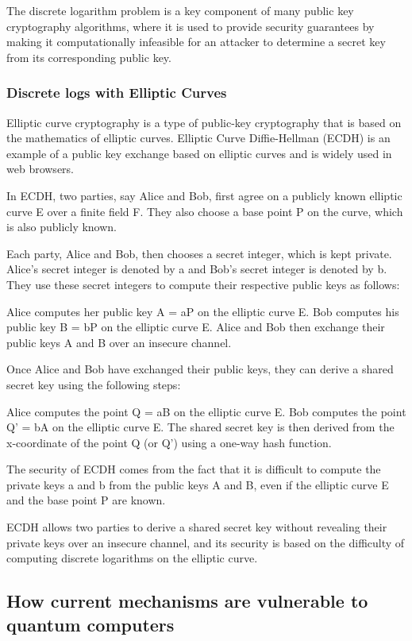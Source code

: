 \documentclass{article}
\begin{document}
The discrete logarithm problem is a key component of many public key cryptography algorithms, where it is used to provide security guarantees by making it computationally infeasible for an attacker to determine a secret key from its corresponding public key.

\subsubsection{Discrete logs with Elliptic Curves}
Elliptic curve cryptography is a type of public-key cryptography that is based on the mathematics of elliptic curves. Elliptic Curve Diffie-Hellman (ECDH) is an example of a public key exchange based on elliptic curves and is widely used in web browsers.

In ECDH, two parties, say Alice and Bob, first agree on a publicly known elliptic curve E over a finite field F. They also choose a base point P on the curve, which is also publicly known.

Each party, Alice and Bob, then chooses a secret integer, which is kept private. Alice's secret integer is denoted by a and Bob's secret integer is denoted by b. They use these secret integers to compute their respective public keys as follows:

Alice computes her public key A = aP on the elliptic curve E.
Bob computes his public key B = bP on the elliptic curve E.
Alice and Bob then exchange their public keys A and B over an insecure channel.

Once Alice and Bob have exchanged their public keys, they can derive a shared secret key using the following steps:

Alice computes the point Q = aB on the elliptic curve E.
Bob computes the point Q' = bA on the elliptic curve E.
The shared secret key is then derived from the x-coordinate of the point Q (or Q') using a one-way hash function.

The security of ECDH comes from the fact that it is difficult to compute the private keys a and b from the public keys A and B, even if the elliptic curve E and the base point P are known.

ECDH allows two parties to derive a shared secret key without revealing their private keys over an insecure channel, and its security is based on the difficulty of computing discrete logarithms on the elliptic curve.

\subsection{How current mechanisms are vulnerable to quantum computers}
\end{document}
